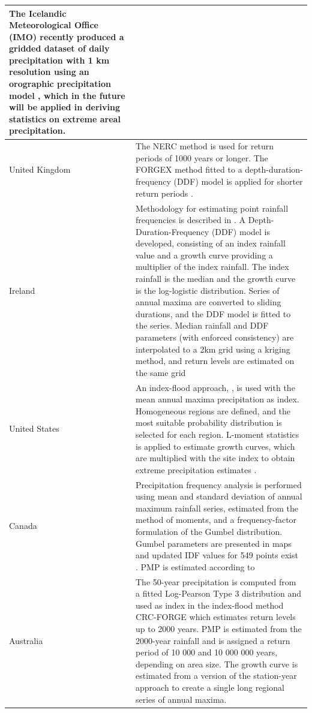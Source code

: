 \documentclass[12pt,a4paper,english]{article}
\begin{document}
\begin{table}[t]
{\begin{tabular}{|p{3cm}||p{13cm}|}
The Icelandic Meteorological Office (IMO) recently produced a gridded dataset of daily precipitation with 1 km resolution using an orographic precipitation model \citep{Crochetetal2007}, which in the future will be applied in deriving statistics on extreme areal precipitation.\\
\hline
United Kingdom & \scriptsize The NERC method is used for return periods of 1000 years or longer. The FORGEX method \citep{Reedetal1999} fitted to a depth-duration-frequency (DDF) model is applied for shorter return periods \citep{Faulkner1999}.\\
\hline
Ireland & \scriptsize Methodology for estimating point rainfall frequencies is described in \cite{Fitzgerald2007}.
A Depth-Duration-Frequency (DDF) model is developed, consisting of an index rainfall value and a growth curve providing a multiplier of the index rainfall. The index rainfall is the median and the growth curve is the log-logistic distribution.
Series of annual maxima  are converted to sliding durations, and the DDF model is fitted to the series. Median rainfall and DDF parameters (with enforced consistency) are interpolated to a 2km grid using a kriging method, and return levels are estimated on the same grid\\
\hline
United States & \scriptsize An index-flood approach, \citep[e.g.][]{Stedingeretal1993}, is used with the mean annual maxima precipitation as index. Homogeneous regions are defined, and the most suitable probability distribution is selected for each region. L-moment statistics is applied to estimate growth curves, which are multiplied with the site index to obtain extreme precipitation estimates \citep{Pericaetal2009}.\\
\hline
Canada & \scriptsize Precipitation frequency analysis is performed using mean and standard deviation of annual maximum rainfall series, estimated from the method of moments, and a frequency-factor formulation of the Gumbel distribution. Gumbel parameters are presented in maps and updated IDF values for 549 points exist \citep{Hoggetal1989, HoggandCarr1985}. PMP is estimated according to \cite{Hershfield1977}\\
\hline
Australia & \scriptsize The 50-year precipitation is computed from a fitted Log-Pearson Type 3 distribution and used as index in the index-flood method CRC-FORGE \citep{Weinmannetal1999} which estimates return levels up to 2000 years. PMP is estimated from the 2000-year rainfall and is assigned a return period of 10 000 and 10 000 000 years, depending on area size. The growth curve is estimated from a version of the station-year approach to create a single long regional series of annual maxima. \\
\hline
\end{tabular}
}
\end{table}
\end{document}

